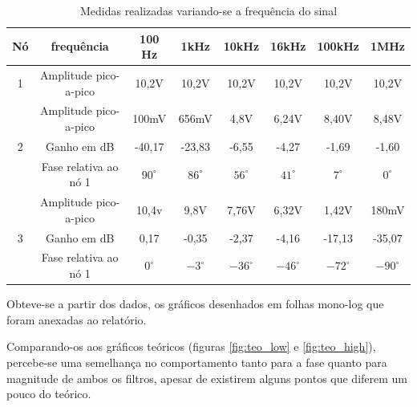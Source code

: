 \documentclass[a4paper]{article} %
\begin{document}

%
\begin{table}[h]
\begin{centering}
\caption{Medidas realizadas variando-se a frequência do sinal \label{tab:var-freq}}
\begin{tabular}{|c|c|c|c|c|c|c|c|}
\hline 
Nó & frequência & 100 Hz & 1kHz & 10kHz & 16kHz & 100kHz & 1MHz\tabularnewline
\hline
\hline 
1 & Amplitude pico-a-pico & 10,2V & 10,2V  & 10,2V & 10,2V & 10,2V  &10,2V \tabularnewline
\hline 
\multirow{3}{*}{2}
 & Amplitude pico-a-pico & 100mV & 656mV & 4,8V & 6,24V & 8,40V & 8,48V \tabularnewline
\cline{2-8} 
 & \multicolumn{1}{c|}{Ganho em dB} & -40,17 & -23,83  & -6,55 & -4,27  & -1,69  & -1,60 \tabularnewline
\cline{2-8} 

 & Fase relativa ao nó 1 & $90^{\circ}$ & $86^{\circ}$  & $56^{\circ}$  & $41^{\circ}$  & $7^{\circ}$  & $0^{\circ}$ \tabularnewline
\hline 
\multirow{3}{*}{3}
 & Amplitude pico-a-pico & 10,4v & 9,8V & 7,76V & 6,32V  & 1,42V  & 180mV \tabularnewline
\cline{2-8} 
 
 & Ganho em dB &  0,17 & -0,35  & -2,37 & -4,16 & -17,13 & -35,07\tabularnewline
\cline{2-8} 
 
 & Fase relativa ao nó 1 & $0^{\circ}$ & $-3^{\circ}$ & $-36^{\circ}$  & $-46^{\circ}$  & $-72^{\circ}$  & $-90^{\circ}$ \tabularnewline
\hline
\end{tabular}
\par\end{centering}

\end{table}


Obteve-se a partir dos dados, os gráficos desenhados em folhas mono-log que foram anexadas ao relatório.

Comparando-os aos gráficos teóricos (figuras \ref{fig:teo_low} e \ref{fig:teo_high}), percebe-se uma semelhança no comportamento tanto para a fase quanto para magnitude de ambos os filtros, apesar de existirem alguns pontos que diferem um pouco do teórico.   
\end{document}
